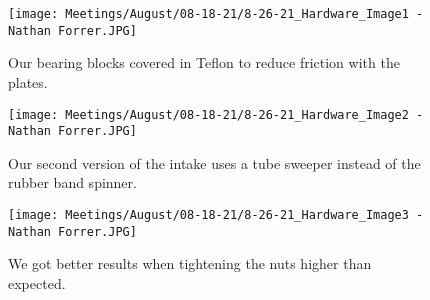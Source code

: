 \begin{figure}[ht]
\centering
\begin{minipage}[b]{.50\textwidth}
  \centering
  \texttt{[image: Meetings/August/08-18-21/8-26-21\_Hardware\_Image1 - Nathan Forrer.JPG]}
  \caption{Our bearing blocks covered in Teflon to reduce friction with the plates.}
  \label{fig:pic1}
\end{minipage}%
\hfill%
\begin{minipage}[b]{.50\textwidth}
  \centering
  \texttt{[image: Meetings/August/08-18-21/8-26-21\_Hardware\_Image2 - Nathan Forrer.JPG]}
  \caption{Our second version of the intake uses a tube sweeper instead of the rubber band spinner.}
  \label{fig:pic2}
\end{minipage}
\end{figure}

\begin{figure}[htp]
\centering
\texttt{[image: Meetings/August/08-18-21/8-26-21\_Hardware\_Image3 - Nathan Forrer.JPG]}
\caption{We got better results when tightening the nuts higher than expected.}
\label{fig:pic3}
\end{figure}